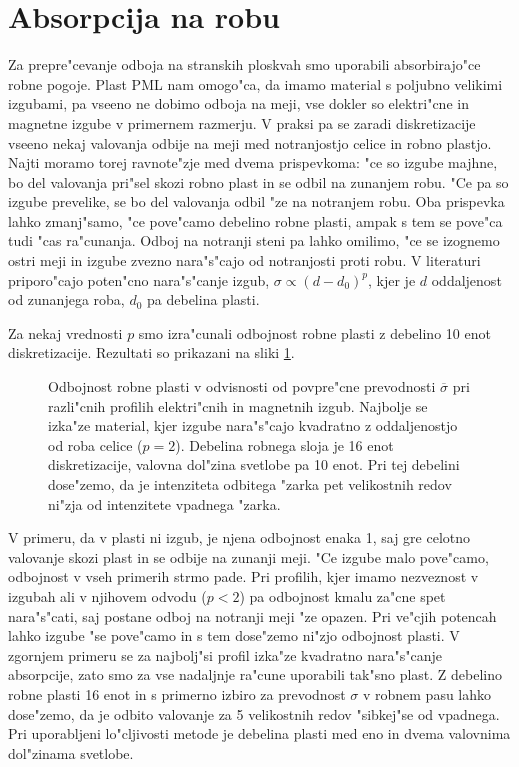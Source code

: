 \documentclass[12pt,twoside,openright,final]{report}
\begin{document}
\section{Absorpcija na robu}
Za prepre"cevanje odboja na stranskih ploskvah smo uporabili absorbirajo"ce robne pogoje. 
Plast \acs{PML} nam omogo"ca, da imamo material s poljubno velikimi izgubami, pa vseeno ne dobimo odboja na meji, vse dokler so elektri"cne in magnetne izgube v primernem razmerju. 
V praksi pa se zaradi diskretizacije vseeno nekaj valovanja odbije na meji med notranjostjo celice in robno plastjo. 
Najti moramo torej ravnote"zje med dvema prispevkoma: "ce so izgube majhne, bo del valovanja pri"sel skozi robno plast in se odbil na zunanjem robu. 
"Ce pa so izgube prevelike, se bo del valovanja odbil "ze na notranjem robu. 
Oba prispevka lahko zmanj"samo, "ce pove"camo debelino robne plasti, ampak s tem se pove"ca tudi "cas ra"cunanja. 
Odboj na notranji steni pa lahko omilimo, "ce se izognemo ostri meji in izgube zvezno nara"s"cajo od notranjosti proti robu. 
V literaturi \cite{taflove} priporo"cajo poten"cno nara"s"canje izgub, $\sigma \propto (d-d_0)^{p}$, kjer je $d$ oddaljenost od zunanjega roba, $d_0$ pa debelina plasti. 

Za nekaj vrednosti $p$ smo izra"cunali odbojnost robne plasti z debelino 10 enot diskretizacije. 
Rezultati so prikazani na sliki \ref{fig:test-absorption}. 

\begin{figure}[!htbp]
 
 \caption{Odbojnost robne plasti v odvisnosti od povpre"cne prevodnosti $\overline{\sigma}$ pri razli"cnih profilih elektri"cnih in magnetnih izgub. Najbolje se izka"ze material, kjer izgube nara"s"cajo kvadratno z oddaljenostjo od roba celice ($p=2$). Debelina robnega sloja je 16 enot diskretizacije, valovna dol"zina svetlobe pa 10 enot. Pri tej debelini dose"zemo, da je intenziteta odbitega "zarka pet velikostnih redov ni"zja od intenzitete vpadnega "zarka. }
 \label{fig:test-absorption}
\end{figure}

V primeru, da v plasti ni izgub, je njena odbojnost enaka 1, saj gre celotno valovanje skozi plast in se odbije na zunanji meji. 
"Ce izgube malo pove"camo, odbojnost v vseh primerih strmo pade. 
Pri profilih, kjer imamo nezveznost v izgubah ali v njihovem odvodu ($p<2$) pa odbojnost kmalu za"cne spet nara"s"cati, saj postane odboj na notranji meji "ze opazen.
Pri ve"cjih potencah lahko izgube "se pove"camo in s tem dose"zemo ni"zjo odbojnost plasti. 
V zgornjem primeru se za najbolj"si profil izka"ze kvadratno nara"s"canje absorpcije, zato smo za vse nadaljnje ra"cune uporabili tak"sno plast. 
Z debelino robne plasti 16 enot in s primerno izbiro za prevodnost $\sigma$ v robnem pasu lahko dose"zemo, da je odbito valovanje za 5 velikostnih redov "sibkej"se od vpadnega. 
Pri uporabljeni lo"cljivosti metode je debelina plasti med eno in dvema valovnima dol"zinama svetlobe. 
\end{document}
